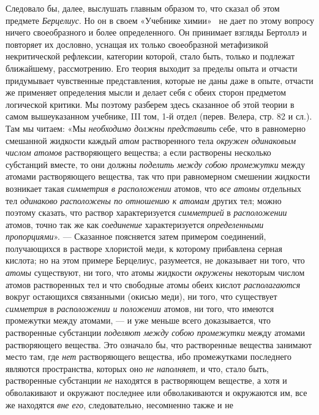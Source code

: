 Следовало бы, далее, выслушать главным образом то, что сказал об этом
предмете {\em Берцелиус}. Но он в своем «Учебнике
химии»~
не дает по этому вопросу ничего своеобразного и более определенного. Он
принимает взгляды Бертоллэ и повторяет их дословно, уснащая их только
своеобразной метафизикой некритической рефлексии, категории которой, стало
быть, только и подлежат ближайшему, рассмотрению. Его теория выходит за
пределы опыта и отчасти придумывает чувственные представления, которые не
даны даже в опыте, отчасти же применяет определения мысли и делает себя с
обеих сторон предметом логической критики. Мы поэтому разберем здесь
сказанное об этой теории в самом вышеуказанном учебнике, III том, 1-й отдел
(перев. Велера, стр. 82 и сл.). Там мы читаем: «Мы
{\em необходимо должны представить} себе, что в
равномерно смешанной жидкости каждый {\em атом}
растворенного тела {\em окружен одинаковым числом
атомов} растворяющего вещества; а если растворены несколько субстанций
вместе, то они должны {\em поделить между собою
промежутки} между атомами растворяющего вещества, так что при равномерном
смешении жидкости возникает такая {\em симметрия в
расположении} атомов, что {\em все атомы} отдельных тел
{\em одинаково расположены по отношению к атомам}
других тел; можно поэтому сказать, что раствор характеризуется
{\em симметрией} в
{\em расположении} атомов, точно так же как
{\em соединение} характеризуется
{\em определенными пропорциями}». — Сказанное
поясняется затем примером соединений, получающихся в растворе хлористой
меди, к которому прибавлена серная кислота; но на этом примере Берцелиус,
разумеется, не доказывает ни того, что {\em атомы}
существуют, ни того, что атомы жидкости {\em окружены}
некоторым числом атомов растворенных тел и что свободные атомы обеих кислот
{\em располагаются} вокруг остающихся связанными
(окисью меди), ни того, что существует {\em симметрия}
в {\em расположении и положении} атомов, ни того, что
имеются промежутки между атомами, — и уже меньше всего доказывается, что
растворенные субстанции {\em поделяют между собою
промежутки} между атомами растворяющего вещества. Это означало бы, что
растворенные вещества занимают место там, где {\em нет}
растворяющего вещества, ибо промежутками последнего являются пространства,
которых оно {\em не наполняет}, и что, стало быть,
растворенные субстанции {\em не} находятся в
растворяющем веществе, а хотя и обволакивают и окружают последнее или
обволакиваются и окружаются им, все же находятся
{\em вне его}, следовательно, несомненно также и не

